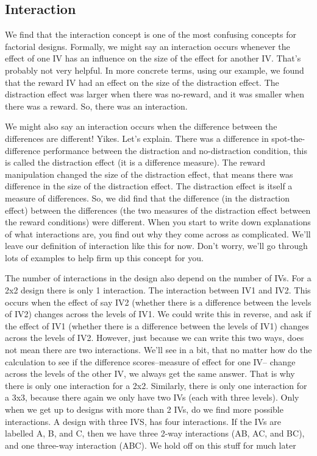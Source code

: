 \documentclass[]{book}
\begin{document}
\hypertarget{interaction}{%
\subsection{Interaction}\label{interaction}}

We find that the interaction concept is one of the most confusing concepts for factorial designs. Formally, we might say an interaction occurs whenever the effect of one IV has an influence on the size of the effect for another IV. That's probably not very helpful. In more concrete terms, using our example, we found that the reward IV had an effect on the size of the distraction effect. The distraction effect was larger when there was no-reward, and it was smaller when there was a reward. So, there was an interaction.

We might also say an interaction occurs when the difference between the differences are different! Yikes. Let's explain. There was a difference in spot-the-difference performance between the distraction and no-distraction condition, this is called the distraction effect (it is a difference measure). The reward manipulation changed the size of the distraction effect, that means there was difference in the size of the distraction effect. The distraction effect is itself a measure of differences. So, we did find that the difference (in the distraction effect) between the differences (the two measures of the distraction effect between the reward conditions) were different. When you start to write down explanations of what interactions are, you find out why they come across as complicated. We'll leave our definition of interaction like this for now. Don't worry, we'll go through lots of examples to help firm up this concept for you.

The number of interactions in the design also depend on the number of IVs. For a 2x2 design there is only 1 interaction. The interaction between IV1 and IV2. This occurs when the effect of say IV2 (whether there is a difference between the levels of IV2) changes across the levels of IV1. We could write this in reverse, and ask if the effect of IV1 (whether there is a difference between the levels of IV1) changes across the levels of IV2. However, just because we can write this two ways, does not mean there are two interactions. We'll see in a bit, that no matter how do the calculation to see if the difference scores--measure of effect for one IV-- change across the levels of the other IV, we always get the same answer. That is why there is only one interaction for a 2x2. Similarly, there is only one interaction for a 3x3, because there again we only have two IVs (each with three levels). Only when we get up to designs with more than 2 IVs, do we find more possible interactions. A design with three IVS, has four interactions. If the IVs are labelled A, B, and C, then we have three 2-way interactions (AB, AC, and BC), and one three-way interaction (ABC). We hold off on this stuff for much later
\end{document}
